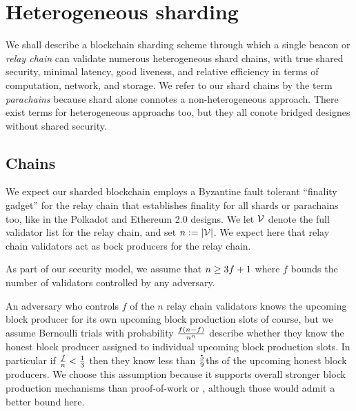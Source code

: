\section{Heterogeneous sharding}

We shall describe a blockchain sharding scheme through which a single beacon or {\em relay chain} can validate numerous heterogeneous shard chains, with true shared security, minimal latency, good liveness, and relative efficiency in terms of computation, network, and storage.  We refer to our shard chains by the term {\em parachains} because shard alone connotes a non-heterogeneous approach.  There exist terms for heterogeneous approachs too, but they all conote bridged designes without shared security.  

\subsection{Chains}

We expect our sharded blockchain employs a Byzantine fault tolerant ``finality gadget'' for the relay chain that establishes finality for all shards or parachains too, like in the Polkadot and Ethereum 2.0 designs.  We let $\mathcal{V}$ denote the full validator list for the relay chain, and set $n := |\mathcal{V}|$.  We expect here that relay chain validators act as bock producers for the relay chain.  

As part of our security model, we assume that $n \ge 3 f + 1$ where $f$ bounds the number of validators controlled by any adversary.

An adversary who controls $f$ of the $n$ relay chain validators knows the upcoming block producer for its own upcoming block production slots of course, but we assume Bernoulli trials with probability ${f (n-f) \over n^n}$ describe whether they know the honest block producer assigned to individual upcoming block production slots.  In particular if ${f \over n} < {1\over3}$ then they know less than ${5 \over 9}$ths of the upcoming honest block producers.
We choose this assumption because it supports overall stronger block production mechanisms than proof-of-work or \cite{Praos}, although those would admit a better bound here.

